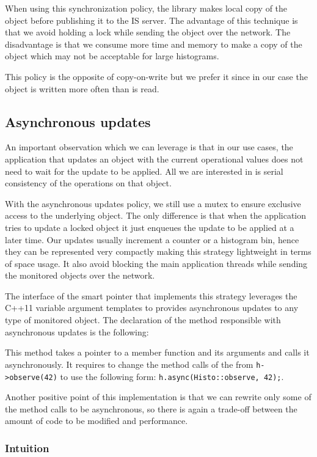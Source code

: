 When using this synchronization policy, the library makes local copy of the object before publishing it to the IS server. The advantage of this technique is that we avoid holding a lock while sending the object over the network. The disadvantage is that we consume more time and memory to make a copy of the object which may not be acceptable for large histograms.

This policy is the opposite of copy-on-write but we prefer it since in our case the object is written more often than is read.

\subsection{Asynchronous updates}

An important observation which we can leverage is that in our use cases, the application that updates an object with the current operational values does not need to wait for the update to be applied. All we are interested in is serial consistency of the operations on that object. 

With the asynchronous updates policy, we still use a mutex to ensure exclusive access to the underlying object. The only difference is that when the application tries to update a locked object it just enqueues the update to be applied at a later time. Our updates usually increment a counter or a histogram bin, hence they can be represented very compactly making this strategy lightweight in terms of space usage. It also avoid blocking the main application threads while sending the monitored objects over the network.

The interface of the smart pointer that implements this strategy leverages the C++11 variable argument templates to provides asynchronous updates to any type of monitored object. The declaration of the method responsible with asynchronous updates is the following:


This method takes a pointer to a member function and its arguments and calls it asynchronously. It requires to change the method calls of the from \verb+h->observe(42)+ to use the following form: \verb+h.async(Histo::observe, 42);+.

Another positive point of this implementation is that we can rewrite only some of the method calls to be asynchronous, so there is again a trade-off between the amount of code to be modified and performance.

\subsubsection*{Intuition}

